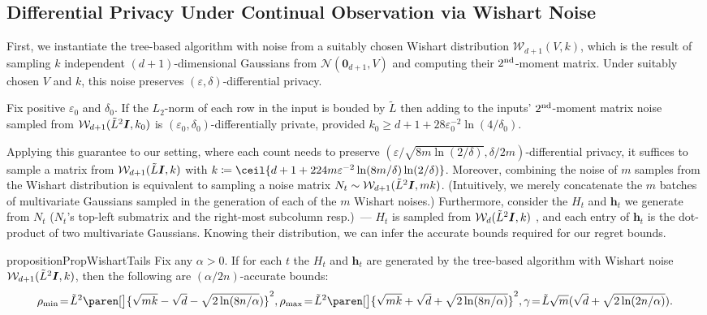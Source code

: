 \documentclass{article}
\renewcommand{\vec}[1]{\bm{#1}}
\newcommand{\defeq}{\coloneq}
\DeclarePairedDelimiter{\paren}()
\DeclarePairedDelimiter{\ceil}\lceil\rceil
\newcommand{\Wishart}{\mathcal{W}}
\newcommand{\Normal}{\mathcal{N}}
\newcommand{\Eye}[1][]{\bm{I}\notblank{#1}{_{{#1}\times{#1}}}{}}
\begin{document}
\subsection{Differential Privacy Under Continual Observation via Wishart Noise}
\label{sec:dp-wishart}

First, we instantiate the tree-based algorithm with noise from a
suitably chosen Wishart distribution $\Wishart_{d+1}(V, k)$, which is the
result of sampling $k$ independent $(d+1)$-dimensional Gaussians from
$\Normal(\vec 0_{d+1}, V)$ and computing their $2^{\rm nd}$-moment
matrix. Under suitably chosen $V$ and $k$, this noise preserves
$(\varepsilon,\delta)$-differential privacy.

\begin{theorem}%
  \label{thm:wishart-cont-dp}
  Fix positive $\varepsilon_0$ and $\delta_0$. If the $L_2$-norm of each
  row in the input is bouded by $\tilde L$ then adding to the inputs'
  $2^{\rm nd}$-moment matrix noise sampled from $\Wishart_{d+1}(\tilde
  L^2 \Eye, k_0)$ is $(\varepsilon_0,\delta_0)$-differentially private,
  provided $k_0\geq d+1 + 28\varepsilon_0^{-2}\ln(4/\delta_0)$.
\end{theorem}
Applying this guarantee to our setting, where each count needs to
preserve
$(\varepsilon/\sqrt{8m\ln(2/\delta)}, \delta/2m)$-differential
privacy, it suffices to sample a matrix from
$\Wishart_{d+1}(\tilde{L} \Eye, k)$ with
$k \defeq \ceil{d+1 + 224
  m\varepsilon^{-2}\ln(8m/\delta)\ln(2/\delta)}$. Moreover, combining
the noise of $m$ samples from the Wishart distribution is equivalent
to sampling a noise matrix
$N_t\sim \Wishart_{d+1}(\tilde L^2\Eye, mk)$. (Intuitively, we merely
concatenate the $m$ batches of multivariate Gaussians sampled in the
generation of each of the $m$ Wishart noises.) Furthermore, consider
the $H_t$ and $\vec h_t$ we generate from $N_t$ ($N_t$'s top-left
submatrix and the right-most subcolumn resp.)~--- $H_t$ is sampled
from $\Wishart_d(\tilde L^2\Eye,k)$ , and each entry of $\vec h_t$ is
the dot-product of two multivariate Gaussians. Knowing their
distribution, we can infer the accurate bounds required for our regret
bounds.
\begin{restatable}{proposition}{PropWishartTails}
\label{pro:accurate_bounds_for_Wishart}
Fix any $\alpha>0$. If for each $t$ the $H_t$ and $\vec h_t$ are
generated by the tree-based algorithm with Wishart noise
$\Wishart_{d+1}(\tilde L^2 \Eye, k)$, then the following
are $(\alpha/2n)$-accurate bounds:
{\small
  \renewcommand\defeq{\!=\!}
  \begin{align*}
    \rho_{\min} \defeq \tilde L^2 \paren[\big]{\sqrt{mk}
                 - \sqrt{d} - \sqrt{2\ln(8n/\alpha})}^2,
    \rho_{\max} \defeq \tilde L^2 \paren[\big]{\sqrt{mk}
                 + \sqrt{d} + \sqrt{2\ln(8n/\alpha)}}^2,
    \gamma \defeq \tilde L\sqrt{m}(\sqrt{d} + \sqrt{2\ln(2n/\alpha)}).
 \end{align*}}
\end{restatable}
\end{document}
